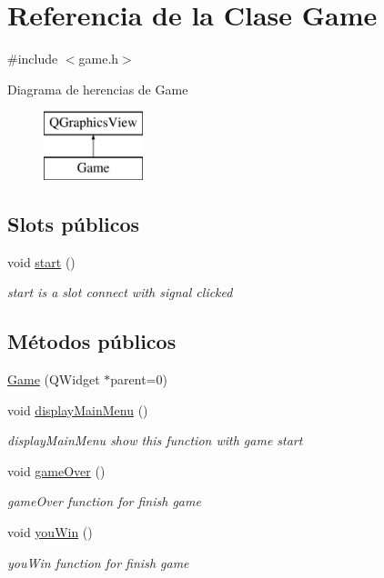 \hypertarget{class_game}{}\section{Referencia de la Clase Game}
\label{class_game}


{\ttfamily \#include $<$game.\+h$>$}

Diagrama de herencias de Game\begin{figure}[H]
\begin{center}
\leavevmode
\includegraphics[height=2.000000cm]{class_game}
\end{center}
\end{figure}
\subsection*{Slots públicos}
\begin{DoxyCompactItemize}
\item 
void \hyperlink{class_game_a3d9b98f7c4a96ecf578f75b96c9f0e90}{start} ()
\begin{DoxyCompactList}\small\item\em start is a slot connect with signal clicked \end{DoxyCompactList}\end{DoxyCompactItemize}
\subsection*{Métodos públicos}
\begin{DoxyCompactItemize}
\item 
\hyperlink{class_game_ae3c64a8dd73de0a99849db8ec0e9a86c}{Game} (Q\+Widget $\ast$parent=0)
\item 
void \hyperlink{class_game_af74fd203e3b31917ca9d4769fa608c48}{display\+Main\+Menu} ()
\begin{DoxyCompactList}\small\item\em display\+Main\+Menu show this function with game start \end{DoxyCompactList}\item 
void \hyperlink{class_game_ac7d371f3f30513a4f3c57f521fac9b5f}{game\+Over} ()
\begin{DoxyCompactList}\small\item\em game\+Over function for finish game \end{DoxyCompactList}\item 
void \hyperlink{class_game_a574eb7e3a432099107f3fb3150d2d6ad}{you\+Win} ()
\begin{DoxyCompactList}\small\item\em you\+Win function for finish game \end{DoxyCompactList}\end{DoxyCompactItemize}
